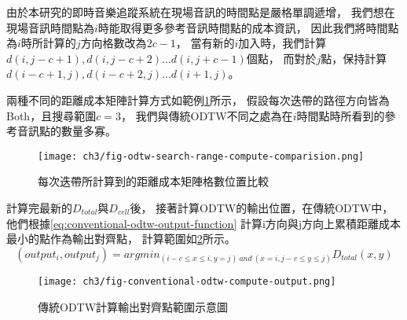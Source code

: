 \documentclass[class=NCU_thesis, crop=false]{standalone}
\begin{document}
由於本研究的即時音樂追蹤系統在現場音訊的時間點是嚴格單調遞增，
我們想在現場音訊時間點為$i$時能取得更多參考音訊時間點的成本資訊，
因此我們將時間點為$i$時所計算的$j$方向格數改為$2c-1$，
當有新的$i$加入時，我們計算$d(i, j-c+1), d(i, j-c+2) \dots d(i, j+c-1)$個點，
而對於$j$點，保持計算$d(i-c+1, j), d(i-c+2, j) \dots d(i+1, j)$。

兩種不同的距離成本矩陣計算方式如範例\cref{fig:fig-ch3-odtw-search-range-compute-comparision}所示，
假設每次迭帶的路徑方向皆為Both，且搜尋範圍$c=3$，
我們與傳統ODTW不同之處為在$i$時間點時所看到的參考音訊點的數量多寡。
\begin{figure}[H]
    \centering
    \texttt{[image: ch3/fig-odtw-search-range-compute-comparision.png]}
    \caption{每次迭帶所計算到的距離成本矩陣格數位置比較}
    \label{fig:fig-ch3-odtw-search-range-compute-comparision}
\end{figure}

計算完最新的$D_{total}$與$D_{cell}$後，
接著計算ODTW的輸出位置，在傳統ODTW中，
他們根據\cref{eq:conventional-odtw-output-function}
計算i方向與j方向上累積距離成本最小的點作為輸出對齊點，
計算範圍如\cref{fig:fig-ch3-conventional-odtw-compute-output}所示。
\begin{equation} 
    \label{eq:conventional-odtw-output-function}
    (output_i, output_j) = argmin_{(i-c \leq x \leq i, y=j)\ and\ (x=i, j-c \leq y \leq j)}D_{total}(x,y)
\end{equation}

\begin{figure}[H]
    \centering
    \texttt{[image: ch3/fig-conventional-odtw-compute-output.png]}
    \caption{傳統ODTW計算輸出對齊點範圍示意圖}
    \label{fig:fig-ch3-conventional-odtw-compute-output}
\end{figure}
\end{document}

